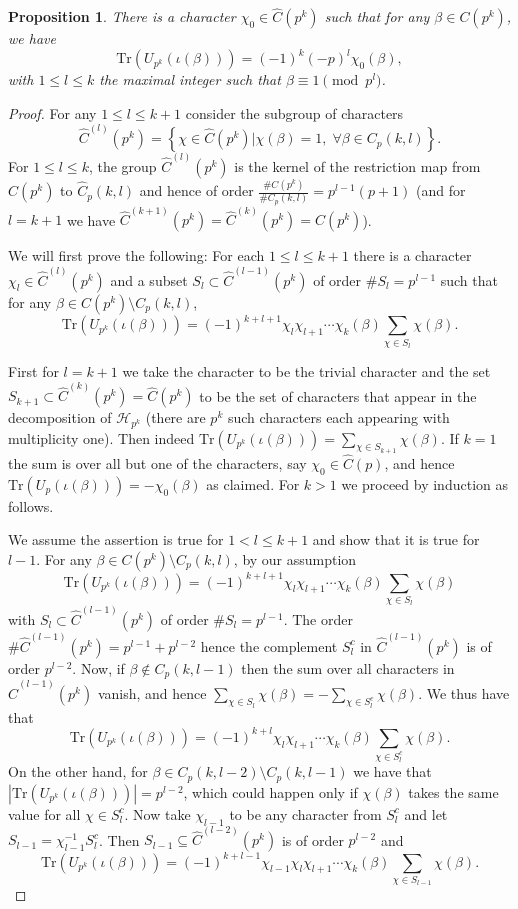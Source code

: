 \documentclass[12pt]{amsart}
\newtheorem{prop}[lem]{Proposition}
\theoremstyle{definition}
\theoremstyle{remark}
\numberwithin{equation}{section}
\newcommand{\set}[1]{\left\{#1\right\}}
\newcommand{\Tr}{ \mbox{Tr}}
\newcommand{\calH}{\mathcal{H}}
\begin{document}
\begin{prop}
There is a character $\chi_0\in \hat C(p^k)$ such that for any
$\beta\in C(p^k)$, we have
\[\Tr(U_{p^k}(\iota(\beta)))=(-1)^{k}(-p)^l\chi_0(\beta),\]
with $1\leq l\leq k$ the maximal integer such that $\beta\equiv
1\pmod {p^l}$.
\end{prop}

\begin{proof}
For any $1\leq l\leq k+1$ consider the subgroup of characters
\[\hat C^{(l)}(p^k)=\set{\chi\in \hat C(p^k)|\chi(\beta)=1,\;\forall \beta\in C_p(k,l)}.\]
For $1\leq l\leq k$, the group $\hat C^{(l)}(p^k)$ is the kernel of
the restriction map from $\hat C(p^k)$ to $\hat C_p(k,l)$ and hence
of order $\frac{\# C(p^k)}{\# C_p(k,l)}=p^{l-1}(p+1)$ (and for
$l=k+1$ we have $\hat C^{(k+1)}(p^k)=\hat C^{(k)}(p^k)=C(p^k)$).

We will first prove the following: For each $1\leq l\leq k+1$ there
is a character $\chi_l\in \hat C^{(l)}(p^k)$ and a subset
$S_l\subset \hat C^{(l-1)}(p^k)$ of order $\# S_l=p^{l-1}$ such that
for any $\beta\in C(p^k)\setminus C_p(k,l)$,
\[\Tr(U_{p^k}(\iota(\beta)))=(-1)^{k+l+1}\chi_l\chi_{l+1}\cdots\chi_k(\beta)\sum_{\chi\in
S_l}\chi(\beta).\]

First for $l=k+1$ we take the character to be the trivial character
and the set $S_{k+1}\subset \hat C^{(k)}(p^k)=\hat C(p^k)$ to be the
set of characters that appear in the decomposition of $\calH_{p^k}$
(there are $p^k$ such characters each appearing with multiplicity
one). Then indeed $\Tr(U_{p^k}(\iota(\beta)))=\sum_{\chi\in
S_{k+1}}\chi(\beta).$ If $k=1$ the sum is over all but one of the
characters, say $\chi_0\in \hat C(p)$, and hence
$\Tr(U_{p}(\iota(\beta)))=-\chi_0(\beta)$ as claimed. For $k>1$ we
proceed by induction as follows.

We assume the assertion is true for $1<l\leq k+1$ and show that it
is true for $l-1$. For any $\beta\in C(p^k)\setminus
 C_p(k,l)$, by our assumption
\[\Tr(U_{p^k}(\iota(\beta)))=(-1)^{k+l+1}\chi_{l}\chi_{l+1}\cdots\chi_k(\beta)\sum_{\chi\in
S_{l}}\chi(\beta)\] with $S_l\subset \hat C^{(l-1)}(p^k)$ of order
$\# S_l=p^{l-1}$. The order $\# \hat C^{(l-1)}(p^k)=p^{l-1}+p^{l-2}$
hence the complement $S_l^c$ in $\hat C^{(l-1)}(p^k)$ is of order
$p^{l-2}$. Now, if $\beta\not\in C_p(k,l-1)$ then the sum over all
characters in $\hat C^{(l-1)}(p^k)$ vanish, and hence $\sum_{\chi\in
S_{l}}\chi(\beta)=-\sum_{\chi\in S_{l}^c}\chi(\beta)$. We thus have
that
\[\Tr(U_{p^k}(\iota(\beta)))=(-1)^{k+l}\chi_{l}\chi_{l+1}\cdots\chi_k(\beta)\sum_{\chi\in S_{l}^c}\chi(\beta).\]
On the other hand, for $\beta\in C_p(k,l-2)\setminus C_p(k,l-1)$ we
have that $|\Tr(U_{p^k}(\iota(\beta)))|=p^{l-2}$, which could happen
only if $\chi(\beta)$ takes the same value for all $\chi\in
S_{l}^c$. Now take $\chi_{l-1}$ to be any character from $S_{l}^c$
and let $S_{l-1}=\chi_{l-1}^{-1}S_{l}^c$. Then $S_{l-1}\subseteq
\hat C^{(l-2)}(p^k)$ is of order $p^{l-2}$ and
\[\Tr(U_{p^k}(\iota(\beta)))=(-1)^{k+l-1}\chi_{l-1}\chi_l\chi_{l+1}\cdots\chi_k(\beta)\sum_{\chi\in S_{l-1}}\chi(\beta).\]


\end{proof}
\end{document}
